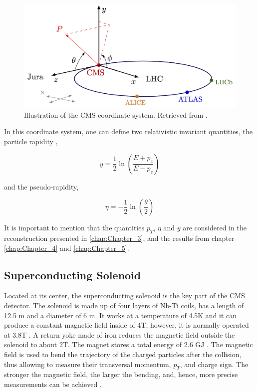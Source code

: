 \begin{figure}[htp!]
	\centering
	\includegraphics{MainContent/Figs/cms_coordinate_system.png}
	\caption{Illustration of the CMS coordinate system. Retrieved from \cite{bonanomi2021response}.}
	\label{fig:cms_coordinate_system}
\end{figure}

In this coordinate system, one can define two relativistic invariant quantities, the particle rapidity \cite{bonanomi2021response},

\begin{equation}
y = \frac{1}{2}\ln\left(\frac{E+p_z}{E-p_z}\right)
\end{equation}

and the pseudo-rapidity,

\begin{equation}
\eta = -\frac{1}{2}\ln\left(\frac{\theta}{2}\right)
\end{equation}

It is important to mention that the quantities $p_T$, $\eta$ and $y$ are considered in the reconstruction presented in \ref{chap:Chapter_3}, and the results from chapter \ref{chap:Chapter_4} and \ref{chap:Chapter_5}.
\subsection{Superconducting Solenoid}
Located at its center, the superconducting solenoid is the key part of the CMS detector. The solenoid is made up of four layers of Nb-Ti coils, has a length of 12.5 m and a diameter of 6 m. It works at a temperature of 4.5K and it can produce a constant magnetic field inside of 4T, however, it is normally operated at 3.8T \cite{baron2018desarrollo, bragagnolo2021measurement}. A return yoke made of iron reduces the magnetic field outside the solenoid to about 2T. The magnet stores a total energy of 2.6 GJ \cite{fedi2016studies}. The magnetic field is used to bend the trajectory of the charged particles after the collision, thus allowing to measure their transversal momentum, $p_T$, and charge sign. The stronger the magnetic field, the larger the bending, and, hence, more precise measurements can be achieved \cite{sanchez2020search, presilla2021lepton}.
